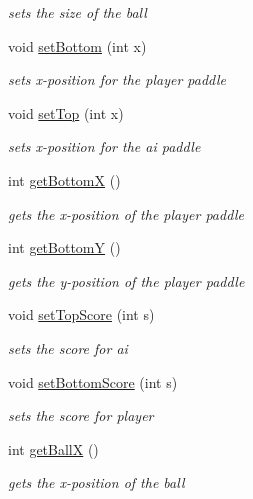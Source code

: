 \begin{DoxyCompactItemize}
\begin{DoxyCompactList}\small\item\em sets the size of the ball \end{DoxyCompactList}\item 
void \hyperlink{classview_1_1_pong_game_display_aeaaff1c8033efd2d7f3242ab3b6c7e9e}{set\+Bottom} (int x)
\begin{DoxyCompactList}\small\item\em sets x-\/position for the player paddle \end{DoxyCompactList}\item 
void \hyperlink{classview_1_1_pong_game_display_a8b9caa56b471453556b7380ee6d37340}{set\+Top} (int x)
\begin{DoxyCompactList}\small\item\em sets x-\/position for the ai paddle \end{DoxyCompactList}\item 
int \hyperlink{classview_1_1_pong_game_display_ab5d2d9429f7d666fea097c2ea3118893}{get\+BottomX} ()
\begin{DoxyCompactList}\small\item\em gets the x-\/position of the player paddle \end{DoxyCompactList}\item 
int \hyperlink{classview_1_1_pong_game_display_afa4d22c9959dc02057a1b56fef3f33cd}{get\+BottomY} ()
\begin{DoxyCompactList}\small\item\em gets the y-\/position of the player paddle \end{DoxyCompactList}\item 
void \hyperlink{classview_1_1_pong_game_display_a04bcc8b60d85f38178d2cd817e3fbd39}{set\+Top\+Score} (int s)
\begin{DoxyCompactList}\small\item\em sets the score for ai \end{DoxyCompactList}\item 
void \hyperlink{classview_1_1_pong_game_display_aa1ef677f1bae92a51750732099b1609a}{set\+Bottom\+Score} (int s)
\begin{DoxyCompactList}\small\item\em sets the score for player \end{DoxyCompactList}\item 
int \hyperlink{classview_1_1_pong_game_display_a83584a112f5bd8877e1bbb1d74dfa080}{get\+BallX} ()
\begin{DoxyCompactList}\small\item\em gets the x-\/position of the ball \end{DoxyCompactList}\item 

\end{DoxyCompactItemize}
